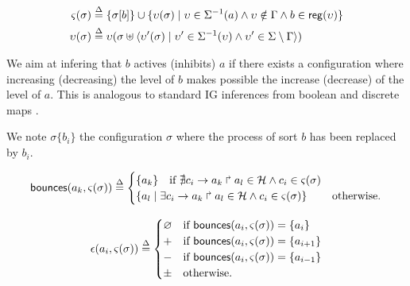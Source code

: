 \begin{align}
\varsigma(\sigma) & \stackrel{\Delta}= \{ \sigma[b] \} \cup \{ \upsilon(\sigma) \mid
\upsilon\in\Sigma^{-1}(a) \wedge  \upsilon \notin\Gamma \wedge b\in \mathsf{reg}({\upsilon}) \}
\label{eq:ctx-sigma}
\\
\upsilon(\sigma) & \stackrel{\Delta}=
\upsilon(\sigma \uplus \langle \upsilon'(\sigma) \mid 
	\upsilon'\in\Sigma^{-1}(\upsilon) \wedge
	\upsilon'\in\Sigma\setminus\Gamma  \rangle)
\label{eq:cooperative-eval}
\end{align}

We aim at infering that $b$ actives (inhibits) $a$ if there exists a configuration where increasing
(decreasing) the level of $b$ makes possible the increase (decrease) of the level of $a$.
This is analogous to standard IG inferences from boolean and discrete maps 
\cite{RiCo07}.


We note $\sigma\{b_i\}$ the configuration $\sigma$ where the process of sort $b$ has been replaced
by $b_i$.

\begin{equation}
\mathsf{bounces}(a_k,\varsigma(\sigma)) \stackrel{\Delta}= 
\begin{cases}
\{ a_k \} \quad\text{if }\nexists c_i\rightarrow a_k\Rsh a_l\in \mathcal{H} \wedge c_i \in \varsigma(\sigma) \\
\{ a_l \mid \exists c_i\rightarrow a_k\Rsh a_l\in \mathcal{H} \wedge c_i \in \varsigma(\sigma) \}
& \text{otherwise.}
\end{cases}
\label{eq:bounces}
\end{equation}


\begin{equation}
\epsilon(a_i, \varsigma(\sigma)) \stackrel{\Delta}=
\begin{cases}
\varnothing & \text{if }\mathsf{bounces}(a_i,\varsigma(\sigma))=\{ a_i \} \\
+ &  \text{if }\mathsf{bounces}(a_i,\varsigma(\sigma)) = \{ a_{i+1} \}\\
- &  \text{if }\mathsf{bounces}(a_i,\varsigma(\sigma)) = \{ a_{i-1} \}\\
\pm & \text{otherwise.}
\end{cases}
\label{eq:epsilon}
\end{equation}

